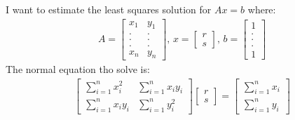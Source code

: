 \documentclass[12pt]{article}
\newenvironment{problem}[2][Problem]{\begin{trivlist}
\item[\hskip \labelsep {\bfseries #1}\hskip \labelsep {\bfseries #2.}]}{\end{trivlist}}
\theoremstyle{definition}
\theoremstyle{definition}
\theoremstyle{definition}
\theoremstyle{definition}
\begin{document}
\begin{problem}{3.50}
I want to estimate the least squares solution for $Ax = b$ where:
\begin{align*}
A = \begin{bmatrix}
x_1 & y_1 \\
. & . \\
. & . \\
. & . \\
x_n & y_n
\end{bmatrix} \text{,  }
x = \begin{bmatrix}
r \\
s
\end{bmatrix} \text{,  }
b = \begin{bmatrix}
1 \\
. \\
. \\
. \\
1
\end{bmatrix}
\end{align*}
The normal equation tho solve is:
\begin{align*}
\begin{bmatrix}
\sum_{i=1}^n x_i^2 & \sum_{i=1}^n x_iy_i \\
\sum_{i=1}^n x_iy_i & \sum_{i=1}^n y_i^2
\end{bmatrix}
\begin{bmatrix}
r \\
s
\end{bmatrix} = \begin{bmatrix}
\sum_{i=1}^n x_i \\
\sum_{i=1}^n y_i
\end{bmatrix}
\end{align*} 
\end{problem}
\end{document}
